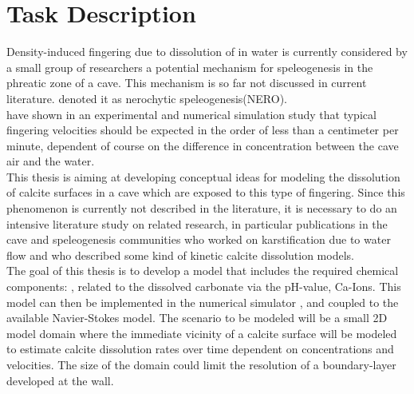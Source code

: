 \chapter*{Task Description}
\thispagestyle{empty}

Density-induced fingering due to dissolution of  in water is currently considered by 
a small group of researchers a potential mechanism for speleogenesis in the phreatic zone of a cave. 
This mechanism is so far not discussed in current literature. \citet{Scherzer2017} denoted it as 
nerochytic speleogenesis(NERO).\\
\citet{Class2020} have shown in an experimental and numerical simulation study that typical fingering 
velocities should be expected in the order of less than a centimeter per minute, dependent of course on 
the difference in  concentration between the cave air and the water. \\

This thesis is aiming at developing conceptual ideas for modeling the dissolution of calcite surfaces in 
a cave which are exposed to this type of fingering. Since this phenomenon is currently not described in 
the literature, it is necessary to do an intensive literature study on related research, in particular 
publications in the cave and speleogenesis communities who worked on karstification due to water flow and 
who described some kind of kinetic
calcite dissolution models.\\

The goal of this thesis is to develop a model that includes the required chemical components: , 
related to the dissolved carbonate via the pH-value, Ca-Ions. This model can then be implemented in the 
numerical simulator \DuMuX \citep{Koch2020}, and coupled to the available Navier-Stokes model. 
The scenario to be modeled will be a small 2D model domain where the immediate vicinity of a calcite 
surface will be modeled to estimate calcite dissolution rates over time dependent on  
concentrations and velocities. The size of the domain could limit the resolution of a boundary-layer developed at the wall.

\endinput
